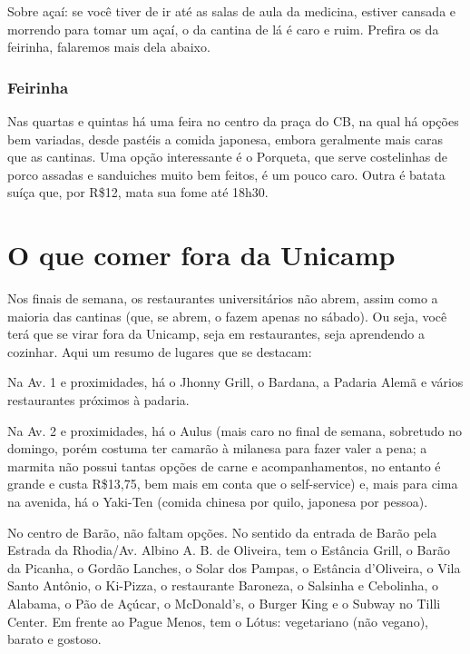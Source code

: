 Sobre açaí: se você tiver de ir até as salas de aula da medicina, estiver
cansada e morrendo para tomar um açaí, o da cantina de lá é caro e ruim.
Prefira os da feirinha, falaremos mais dela abaixo.

\subsubsection{Feirinha}

Nas quartas e quintas há uma feira no centro da praça do CB, na qual há opções
bem variadas, desde pastéis a comida japonesa, embora geralmente mais caras que
as cantinas. Uma opção interessante é o Porqueta, que serve costelinhas de
porco assadas e sanduiches muito bem feitos, é um pouco caro. Outra é batata
suíça que, por R\$12, mata sua fome até 18h30.

\section{O que comer fora da Unicamp}

Nos finais de semana, os restaurantes universitários não abrem, assim como a
maioria das cantinas (que, se abrem, o fazem apenas no sábado). Ou seja, você
terá que se virar fora da Unicamp, seja em restaurantes, seja aprendendo a
cozinhar. Aqui um resumo de lugares que se destacam:

Na Av. 1 e proximidades, há o Jhonny Grill, o Bardana, a Padaria Alemã e vários
restaurantes próximos à padaria.

Na Av. 2 e proximidades, há o Aulus (mais caro no final de semana, sobretudo no
domingo, porém costuma ter camarão à milanesa para fazer valer a pena; a
marmita não possui tantas opções de carne e acompanhamentos, no entanto é
grande e custa R\$13,75, bem mais em conta que o self-service) e, mais para
cima na avenida, há o Yaki-Ten (comida chinesa por quilo, japonesa por pessoa).

No centro de Barão, não faltam opções. No sentido da entrada de Barão pela
Estrada da Rhodia/Av. Albino A. B. de Oliveira, tem o Estância Grill, o Barão
da Picanha, o Gordão Lanches, o Solar dos Pampas, o Estância d'Oliveira, o Vila
Santo Antônio, o Ki-Pizza, o restaurante Baroneza, o Salsinha e Cebolinha, o
Alabama, o Pão de Açúcar, o McDonald's, o Burger King e o Subway no Tilli
Center. Em frente ao Pague Menos, tem o Lótus: vegetariano (não vegano), barato
e gostoso.

